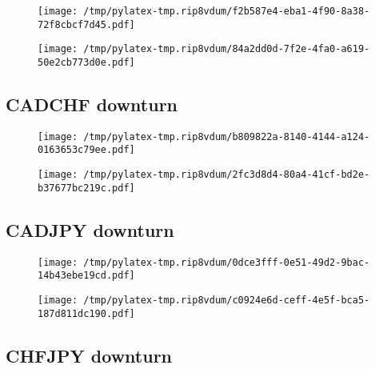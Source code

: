 \documentclass{article}%
\begin{document}
\begin{figure}[htbp]%
\centering%
\texttt{[image: /tmp/pylatex-tmp.rip8vdum/f2b587e4-eba1-4f90-8a38-72f8cbcf7d45.pdf]}%
\end{figure}

%


\begin{figure}[htbp]%
\centering%
\texttt{[image: /tmp/pylatex-tmp.rip8vdum/84a2dd0d-7f2e-4fa0-a619-50e2cb773d0e.pdf]}%
\end{figure}

%
\newpage %
\subsection{CADCHF downturn}%
\label{subsec:CADCHFdownturn}%


\begin{figure}[htbp]%
\centering%
\texttt{[image: /tmp/pylatex-tmp.rip8vdum/b809822a-8140-4144-a124-0163653c79ee.pdf]}%
\end{figure}

%


\begin{figure}[htbp]%
\centering%
\texttt{[image: /tmp/pylatex-tmp.rip8vdum/2fc3d8d4-80a4-41cf-bd2e-b37677bc219c.pdf]}%
\end{figure}

%
\newpage %
\subsection{CADJPY downturn}%
\label{subsec:CADJPYdownturn}%


\begin{figure}[htbp]%
\centering%
\texttt{[image: /tmp/pylatex-tmp.rip8vdum/0dce3fff-0e51-49d2-9bac-14b43ebe19cd.pdf]}%
\end{figure}

%


\begin{figure}[htbp]%
\centering%
\texttt{[image: /tmp/pylatex-tmp.rip8vdum/c0924e6d-ceff-4e5f-bca5-187d811dc190.pdf]}%
\end{figure}

%
\newpage %
\subsection{CHFJPY downturn}%
\label{subsec:CHFJPYdownturn}%
\end{document}
